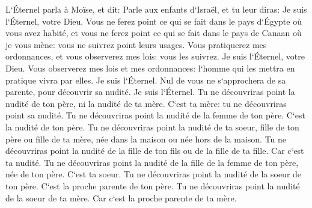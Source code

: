 \verse L`Éternel parla à Moïse, et dit: 
\verse Parle aux enfants d`Israël, et tu leur diras: Je suis l`Éternel, votre Dieu. 
\verse Vous ne ferez point ce qui se fait dans le pays d`Égypte où vous avez habité, et vous ne ferez point ce qui se fait dans le pays de Canaan où je vous mène: vous ne suivrez point leurs usages. 
\verse Vous pratiquerez mes ordonnances, et vous observerez mes lois: vous les suivrez. Je suis l`Éternel, votre Dieu. 
\verse Vous observerez mes lois et mes ordonnances: l`homme qui les mettra en pratique vivra par elles. Je suis l`Éternel. 
\verse Nul de vous ne s`approchera de sa parente, pour découvrir sa nudité. Je suis l`Éternel. 
\verse Tu ne découvriras point la nudité de ton père, ni la nudité de ta mère. C`est ta mère: tu ne découvriras point sa nudité. 
\verse Tu ne découvriras point la nudité de la femme de ton père. C`est la nudité de ton père. 
\verse Tu ne découvriras point la nudité de ta soeur, fille de ton père ou fille de ta mère, née dans la maison ou née hors de la maison. 
\verse Tu ne découvriras point la nudité de la fille de ton fils ou de la fille de ta fille. Car c`est ta nudité. 
\verse Tu ne découvriras point la nudité de la fille de la femme de ton père, née de ton père. C`est ta soeur. 
\verse Tu ne découvriras point la nudité de la soeur de ton père. C`est la proche parente de ton père. 
\verse Tu ne découvriras point la nudité de la soeur de ta mère. Car c`est la proche parente de ta mère. 
